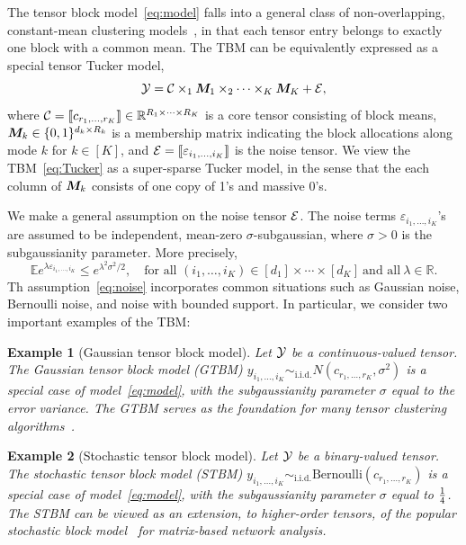 \documentclass{article}
\newtheorem{exam}{Example}
\begin{document}
The tensor block model~\eqref{eq:model} falls into a general class of non-overlapping, constant-mean clustering models~\cite{madeira2004biclustering}, in that each tensor entry belongs to exactly one block with a common mean. The TBM can be equivalently expressed as a special tensor Tucker model,
\begin{equation}\label{eq:Tucker}
\mathcal{Y}=\mathcal{C}\times_1\bm M_1\times_2\cdots \times_K \bm M_K+\mathcal{E},
\end{equation}
where $\mathcal{C}=\llbracket c_{r_1,\ldots,r_K} \rrbracket\in\mathbb{R}^{R_1\times\cdots\times R_K}$ is a core tensor consisting of block means, $\bm M_k \in\{0,1\}^{d_k\times R_k}$ is a membership matrix indicating the block allocations along mode $k$ for $k\in[K]$, and $\mathcal{E}=\llbracket \varepsilon_{i_1,\ldots,i_K} \rrbracket$ is the noise tensor. %
We view the TBM~\eqref{eq:Tucker} as a super-sparse Tucker model, in the sense that the each column of $\bm M_k$ consists of one copy of 1's and massive 0's. 

We make a general assumption on the noise tensor $\mathcal{E}$. The noise terms $\varepsilon_{i_1,\ldots,i_K}$'s are assumed to be independent, mean-zero $\sigma$-subgaussian, where $\sigma>0$ is the subgaussianity parameter. More precisely, 
\begin{equation}\label{eq:noise}
\mathbb{E}e^{\lambda \varepsilon_{i_1,\ldots,i_K}}\leq e^{\lambda^2\sigma^2/2},\quad \text{for all } (i_1,\ldots,i_K)\in[d_1]\times\cdots\times[d_K] \ \text{and all}\ \lambda\in\mathbb{R}.
\end{equation}
Th assumption~\eqref{eq:noise} incorporates common situations such as Gaussian noise, Bernoulli noise, and noise with bounded support. In particular, we consider two important examples of the TBM:

\begin{exam}[Gaussian tensor block model]
Let $\mathcal{Y}$ be a continuous-valued tensor. The Gaussian tensor block model (GTBM) $y_{i_1,\ldots,i_K}  \sim_{\text{i.i.d.}} N(c_{r_1,\ldots,r_K},\sigma^2)$ is a special case of model~\eqref{eq:model}, with the subgaussianity parameter $\sigma$ equal to the error variance. The GTBM serves as the foundation for many tensor clustering algorithms~\cite{jegelka2009approximation,wang2017three,chi2018provable}. 
\end{exam}

\begin{exam}[Stochastic tensor block model]
Let $\mathcal{Y}$ be a binary-valued tensor. The stochastic tensor block model (STBM) $y_{i_1,\ldots,i_K}  \sim_{\text{i.i.d.}} \text{Bernoulli}(c_{r_1,\ldots,r_K})$ is a special case of model~\eqref{eq:model}, with the subgaussianity parameter $\sigma$ equal to ${1\over 4}$. The STBM can be viewed as an extension, to higher-order tensors, of the popular stochastic block model~\cite{gao2018minimax,bickel2009nonparametric,lei2015consistency} for matrix-based network analysis.
\end{exam}
\end{document}
